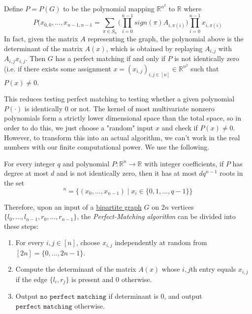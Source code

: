   \begin{lemma}
    \label{thm:matching-polynomial}
  Define $P = P(G)$ to be the polynomial mapping $\mathbb{R}^{n^2}$ to $\mathbb{R}$ where 
  \begin{equation}
    P(x_{0, 0}, ..., x_{n-1, n-1} = \sum_{\pi \in S_n} \bigg( \prod_{i=0}^{n-1} sign(\pi) A_{i, \pi(i)} \bigg) \prod_{i=0}^{n-1} x_{i, \pi(i)}
  \end{equation}
  In fact, given the matrix $A$ representing the graph, the polynomial above is the determinant of the matrix $A(x)$, which is obtained by replaying $A_{i, j}$ with $A_{i, j} x_{i, j}$. Then $G$ has a perfect matching if and only if $P$ is not identically zero (i.e. if there exists some assignment $x = (x_{i, j})_{i, j \in [n]} \in \mathbb{R}^{n^2}$ such that $P(x) \neq 0$. 
  \end{lemma}
  This reduces testing perfect matching to testing whether a given polynomial $P(\cdot)$ is identically $0$ or not. The kernel of most multivariate nonzero polynomials form a strictly lower dimensional space than the total space, so in order to do this, we just choose a "random" input $x$ and check if $P(x) \neq 0$. However, to transform this into an actual algorithm, we can't work in the real numbers with our finite computational power. We use the following. 

  \begin{theorem}
    \label{thm:schwartz-zippel-lemma}
  For every integer $q$ and polynomial $P: \mathbb{R}^n \to \mathbb{R}$ with integer coefficients, if $P$ has degree at most $d$ and is not identically zero, then it has at most $d q^{n-1}$ roots in the set 
  \begin{equation}
    [q]^n = \big\{(x_0, ..., x_{n-1}) \;|\; x_i \in \{0, 1, ..., q-1\}\big\}
  \end{equation}
  \end{theorem}

  Therefore, upon an input of a \hyperref[def:bipartite-graph]{bipartite graph} $G$ on $2n$ vertices $\{l_0, ..., l_{n-1}, r_0, ..., r_{n-1}\}$, the \textit{Perfect-Matching algorithm} can be divided into these steps: 
  \begin{enumerate}
    \item For every $i, j \in [n]$, choose $x_{i, j}$ independently at random from $[2n] = \{0, ..., 2n-1\}$. 
    \item Compute the determinant of the matrix $A(x)$ whose $i, j$th entry equals $x_{i, j}$ if the edge $\{l_i, r_j\}$ is present and $0$ otherwise. 
    \item Output $\texttt{no perfect matching}$ if determinant is $0$, and output $\texttt{perfect matching}$ otherwise. 
  \end{enumerate}


